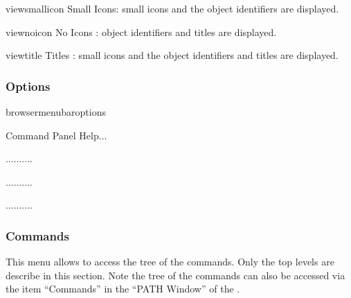 \begin{PAWf}[.7]{viewsmallicon}
Small Icons: small icons  and the object identifiers are displayed.
\end{PAWf}

\newpage

\begin{PAWf}[.7]{viewnoicon}
No Icons : object identifiers and titles are displayed.
\end{PAWf}

\begin{PAWf}[.7]{viewtitle}
Titles : small icons  and the object identifiers and titles are displayed.
\end{PAWf}

\newpage

\subsubsection{Options}

\begin{PAWf}{browsermenubaroptions}
\begin{DLsf}{Command Panel Help...}
\item[Raise Window]           ..........
\item[Command Panel...]       ..........
\item[Command Panel Help...]  ..........
\end{DLsf}
\end{PAWf}

\subsubsection{Commands}

This menu allows to access the tree of the \XPAW{} commands. Only the
top levels are describe in this section. Note the tree of the \XPAW{}
commands can also be accessed via the item ``Commands'' in the ``PATH Window''
of the \MB.

